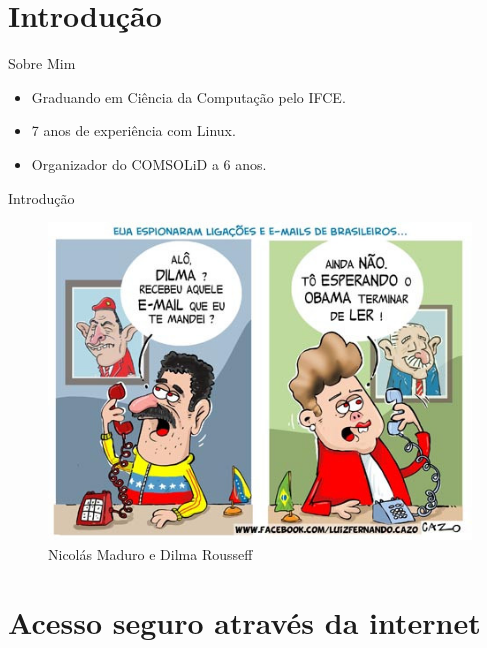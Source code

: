 \section{Introdução}\label{introduuxe7uxe3o}

\begin{frame}{Sobre Mim}

\begin{itemize}
\itemsep1pt\parskip0pt
\item
  Graduando em Ciência da Computação pelo IFCE.
\item
  7 anos de experiência com Linux.
\item
  Organizador do COMSOLiD a 6 anos.
\end{itemize}

\end{frame}

\begin{frame}{Introdução}

\begin{figure}
    \includegraphics[scale=0.5]{img/Espionagem-por-Cazo.jpg}
    \caption{Nicolás Maduro e Dilma Rousseff}
\end{figure}

\end{frame}

\begin{frame}

 

\end{frame}

\section{Acesso seguro através da
internet}\label{acesso-seguro-atravuxe9s-da-internet}

